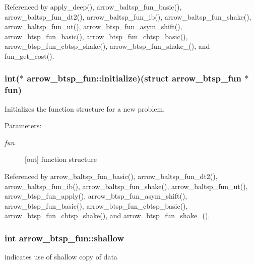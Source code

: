 Referenced by apply\_\-deep(), arrow\_\-baltsp\_\-fun\_\-basic(), arrow\_\-baltsp\_\-fun\_\-dt2(), arrow\_\-baltsp\_\-fun\_\-ib(), arrow\_\-baltsp\_\-fun\_\-shake(), arrow\_\-baltsp\_\-fun\_\-ut(), arrow\_\-btsp\_\-fun\_\-asym\_\-shift(), arrow\_\-btsp\_\-fun\_\-basic(), arrow\_\-btsp\_\-fun\_\-cbtsp\_\-basic(), arrow\_\-btsp\_\-fun\_\-cbtsp\_\-shake(), arrow\_\-btsp\_\-fun\_\-shake\_(), and fun\_\-get\_\-cost().\hypertarget{structarrow__btsp__fun_c588686921bd526653a7e0d7816aee44}{
\subsubsection[{initialize}]{\setlength{\rightskip}{0pt plus 5cm}int($\ast$ {\bf arrow\_\-btsp\_\-fun::initialize})(struct {\bf arrow\_\-btsp\_\-fun} $\ast$fun)}}
\label{structarrow__btsp__fun_c588686921bd526653a7e0d7816aee44}


Initializes the function structure for a new problem. 

\begin{Desc}
\item[Parameters:]
\begin{description}
\item[{\em fun}]\mbox{[}out\mbox{]} function structure \end{description}
\end{Desc}


Referenced by arrow\_\-baltsp\_\-fun\_\-basic(), arrow\_\-baltsp\_\-fun\_\-dt2(), arrow\_\-baltsp\_\-fun\_\-ib(), arrow\_\-baltsp\_\-fun\_\-shake(), arrow\_\-baltsp\_\-fun\_\-ut(), arrow\_\-btsp\_\-fun\_\-apply(), arrow\_\-btsp\_\-fun\_\-asym\_\-shift(), arrow\_\-btsp\_\-fun\_\-basic(), arrow\_\-btsp\_\-fun\_\-cbtsp\_\-basic(), arrow\_\-btsp\_\-fun\_\-cbtsp\_\-shake(), and arrow\_\-btsp\_\-fun\_\-shake\_().\hypertarget{structarrow__btsp__fun_1950686e4862a4b1bd68d1ada85e2c79}{
\subsubsection[{shallow}]{\setlength{\rightskip}{0pt plus 5cm}int {\bf arrow\_\-btsp\_\-fun::shallow}}}
\label{structarrow__btsp__fun_1950686e4862a4b1bd68d1ada85e2c79}


indicates use of shallow copy of data 

